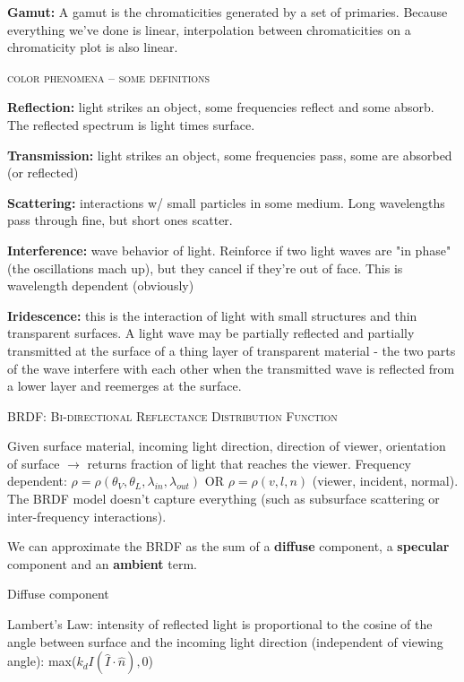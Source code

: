 \documentclass{article}
\begin{document}
\vspace{10pt}
\textbf{Gamut: }
A gamut is the chromaticities generated by a set of primaries. Because everything we've done is linear, interpolation between chromaticities on a chromaticity plot is also linear. 

\begin{center}\textsc{color phenomena -- some definitions}\end{center} 
	
{\bf Reflection:}  light strikes an object, some frequencies reflect and some absorb. The reflected spectrum is light times surface.

{\bf Transmission:}  light strikes an object, some frequencies pass, some are absorbed (or reflected)

{\bf Scattering:} interactions w/ small particles in some medium. Long wavelengths pass through fine, but short ones scatter.

{\bf Interference:} wave behavior of light. Reinforce if two light waves are "in phase" (the oscillations mach up), but they cancel if they're out of face. This is wavelength dependent (obviously)

{\bf Iridescence: } this is the interaction of light with small structures and thin transparent surfaces. A light wave may be partially reflected and partially transmitted at the surface of a thing layer of transparent material - the two parts of the wave interfere with each other when the transmitted wave is reflected from a lower layer and reemerges at the surface.

\begin{center}\textsc{BRDF: Bi-directional Reflectance Distribution Function}\end{center} 
Given surface material, incoming light direction, direction of viewer, orientation of surface $\rightarrow$ returns fraction of light that reaches the viewer. Frequency dependent: $\rho = \rho(\theta_V,\theta_L,\lambda_{in},\lambda_{out})$ OR $\rho = \rho(v,l,n)$ (viewer, incident, normal). The BRDF model doesn't capture everything (such as subsurface scattering or inter-frequency interactions). 

We can approximate the BRDF as the sum of a {\bf diffuse} component, a {\bf specular} component and an {\bf ambient} term.

\vspace{10pt}
Diffuse component

Lambert's Law: intensity of reflected light is proportional to the cosine of the angle between surface and the incoming light direction (independent of viewing angle): max($k_d I (\hat{I}\cdot \hat{n}),0$)
\end{document}

